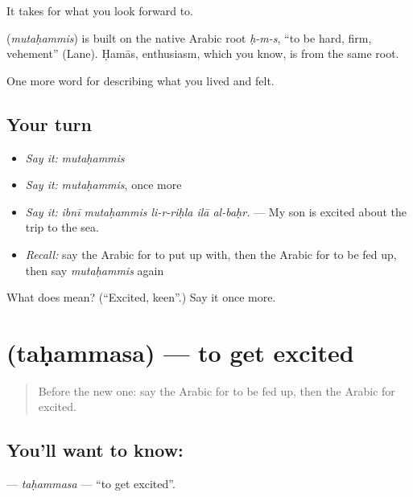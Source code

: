 It takes  for what you look forward to.

\begin{cousinweb}
\textbf{} (\emph{mutaḥammis}) is built on the native Arabic root \emph{ḥ-m-s}, \textquotedblleft{}to be hard, firm, vehement\textquotedblright{} (Lane). Ḥamās, enthusiasm, which you know, is from the same root.
\end{cousinweb}

\begin{grammarlens}[title={What you've built}]
One more word for describing what you lived and felt.
\end{grammarlens}

\subsection*{Your turn}
\begin{itemize}
\raggedright
  \item \emph{Say it:} \emph{mutaḥammis}
  \item \emph{Say it:} \emph{mutaḥammis}, once more
  \item \emph{Say it:} \emph{ibnī mutaḥammis li-r-riḥla ilā al-baḥr.} — My son is excited about the trip to the sea.
  \item \emph{Recall:} say the Arabic for to put up with, then the Arabic for to be fed up, then say \emph{mutaḥammis} again
\end{itemize}

\begin{tcolorbox}[breakable,colback=teal!4,colframe=teal!35!black,title={Before you move on}]
What does  mean? (\textquotedblleft{}Excited, keen\textquotedblright{}.) Say it once more.
\end{tcolorbox}
\section[\texorpdfstring{\ar{تحمس} (taḥammasa)}{تحمس (taḥammasa)}]{ (taḥammasa) — to get excited}

\label{lesson:AR-C496-tahammasa}



\begin{quote}
Before the new one: say the Arabic for to be fed up, then the Arabic for excited.
\end{quote}

\subsection*{You'll want to know: }
\textbf{} — \emph{taḥammasa} — \textquotedblleft{}to get excited\textquotedblright{}.

